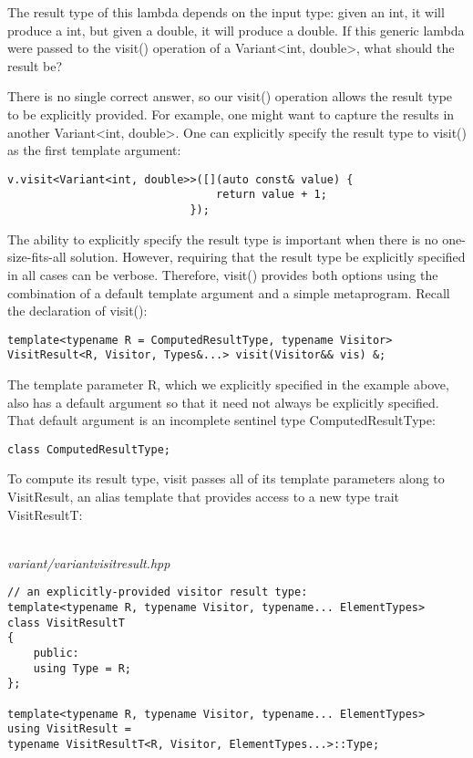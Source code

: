 The result type of this lambda depends on the input type: given an int, it will produce a int, but given a double, it will produce a double. If this generic lambda were passed to the visit() operation of a Variant<int, double>, what should the result be?

There is no single correct answer, so our visit() operation allows the result type to be explicitly provided. For example, one might want to capture the results in another Variant<int, double>. One can explicitly specify the result type to visit() as the first template argument:

\begin{lstlisting}[style=styleCXX]
v.visit<Variant<int, double>>([](auto const& value) {
								return value + 1;
							});
\end{lstlisting}

The ability to explicitly specify the result type is important when there is no one-size-fits-all solution. However, requiring that the result type be explicitly specified in all cases can be verbose. Therefore, visit() provides both options using the combination of a default template argument and a simple metaprogram. Recall the declaration of visit():

\begin{lstlisting}[style=styleCXX]
template<typename R = ComputedResultType, typename Visitor>
VisitResult<R, Visitor, Types&...> visit(Visitor&& vis) &;
\end{lstlisting}

The template parameter R, which we explicitly specified in the example above, also has a default argument so that it need not always be explicitly specified. That default argument is an incomplete sentinel type ComputedResultType:

\begin{lstlisting}[style=styleCXX]
class ComputedResultType;
\end{lstlisting}

To compute its result type, visit passes all of its template parameters along to VisitResult, an alias template that provides access to a new type trait VisitResultT:

\hspace*{\fill} \\ %
\noindent
\textit{variant/variantvisitresult.hpp}
\begin{lstlisting}[style=styleCXX]
// an explicitly-provided visitor result type:
template<typename R, typename Visitor, typename... ElementTypes>
class VisitResultT
{
	public:
	using Type = R;
};

template<typename R, typename Visitor, typename... ElementTypes>
using VisitResult =
typename VisitResultT<R, Visitor, ElementTypes...>::Type;
\end{lstlisting}

